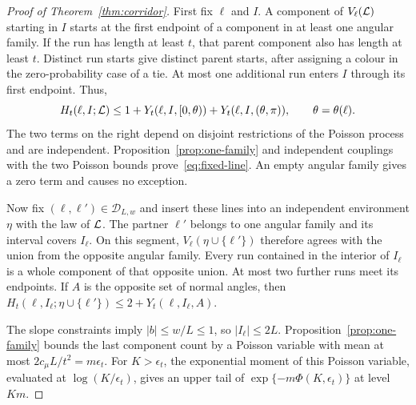 \documentclass[11pt,letterpaper]{article}
\begin{document}
\begin{proof}[Proof of Theorem~\ref{thm:corridor}]
First fix $\ell$ and $I$. A component of $V_\ell(\mathcal L)$ starting in $I$ starts at the first endpoint of a component in at least one angular family. If the run has length at least $t$, that parent component also has length at least $t$. Distinct run starts give distinct parent starts, after assigning a colour in the zero-probability case of a tie. At most one additional run enters $I$ through its first endpoint. Thus,
\begin{equation}\label{eq:assign}
 H_t(\ell,I;\mathcal L)\le1+Y_t(\ell,I,[0,\theta))
                         +Y_t(\ell,I,(\theta,\pi)),
 \qquad \theta=\theta(\ell).
\end{equation}
The two terms on the right depend on disjoint restrictions of the Poisson process and are independent. Proposition~\ref{prop:one-family} and independent couplings with the two Poisson bounds prove~\eqref{eq:fixed-line}. An empty angular family gives a zero term and causes no exception.

Now fix $(\ell,\ell')\in\mathcal D_{L,w}$ and insert these lines into an independent environment $\eta$ with the law of $\mathcal L$. The partner $\ell'$ belongs to one angular family and its interval covers $I_\ell$. On this segment, $V_\ell(\eta\cup\{\ell'\})$ therefore agrees with the union from the opposite angular family. Every run contained in the interior of $I_\ell$ is a whole component of that opposite union. At most two further runs meet its endpoints. If $A$ is the opposite set of normal angles, then $H_t(\ell,I_\ell;\eta\cup\{\ell'\})\le2+Y_t(\ell,I_\ell,A)$.

The slope constraints imply $|b|\le w/L\le1$, so $|I_\ell|\le2L$. Proposition~\ref{prop:one-family} bounds the last component count by a Poisson variable with mean at most $2c_\mu L/t^2=m\epsilon_t$. For $K>\epsilon_t$, the exponential moment of this Poisson variable, evaluated at $\log(K/\epsilon_t)$, gives an upper tail of $\exp\{-m\Phi(K,\epsilon_t)\}$ at level $Km$.


\end{proof}
\end{document}
